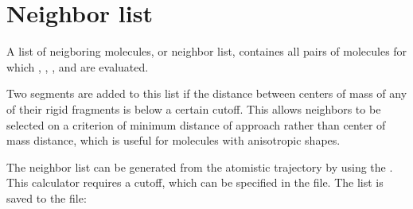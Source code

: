 \section{Neighbor list}
\label{sec:neighborlist}

A list of neigboring molecules, or neighbor list, containes all pairs of molecules for which , , , and  are evaluated.

Two segments are added to this list if the distance between centers of mass of any of their rigid fragments is below a certain cutoff. This allows neighbors to be selected on a criterion of minimum distance of approach rather than center of mass distance, which is useful for molecules with anisotropic shapes.

The neighbor list can be generated from the atomistic trajectory by using the  \calculator. This calculator requires a cutoff, which can be specified in the \xmloptions file. The list is saved to the \sqlstate file:

{\small \ctprun \opt \xmloptions  \seg  \xmlsegments \sql  \sqlstate \exe  {}}
